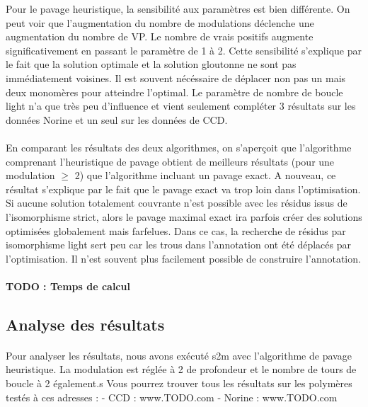\documentclass[12pt,french,twoside]{report}
\begin{document}
Pour le pavage heuristique, la sensibilité aux paramètres est bien différente.
On peut voir que l'augmentation du nombre de modulations déclenche une augmentation du nombre de VP.
Le nombre de vrais positifs augmente significativement en passant le paramètre de 1 à 2.
Cette sensibilité s'explique par le fait que la solution optimale et la solution gloutonne ne sont pas immédiatement voisines.
Il est souvent nécéssaire de déplacer non pas un mais deux monomères pour atteindre l'optimal.
Le paramètre de nombre de boucle light n'a que très peu d'influence et vient seulement compléter 3 résultats sur les données Norine et un seul sur les données de CCD.

\paragraph{}En comparant les résultats des deux algorithmes, on s'aperçoit que l'algorithme comprenant l'heuristique de pavage obtient de meilleurs résultats (pour une modulation $\ge$ 2) que l'algorithme incluant un pavage exact.
A nouveau, ce résultat s'explique par le fait que le pavage exact va trop loin dans l'optimisation.
Si aucune solution totalement couvrante n'est possible avec les résidus issus de l'isomorphisme strict, alors le pavage maximal exact ira parfois créer des solutions optimisées globalement mais farfelues.
Dans ce cas, la recherche de résidus par isomorphisme light sert peu car les trous dans l'annotation ont été déplacés par l'optimisation.
Il n'est souvent plus facilement possible de construire l'annotation.


\paragraph{TODO : Temps de calcul}



\subsection{Analyse des résultats}

\paragraph{}Pour analyser les résultats, nous avons exécuté s2m avec l'algorithme de pavage heuristique.
La modulation est réglée à 2 de profondeur et le nombre de tours de boucle à 2 également.s
Vous pourrez trouver tous les résultats sur les polymères testés à ces adresses :
- CCD : www.TODO.com
- Norine : www.TODO.com
\end{document}
